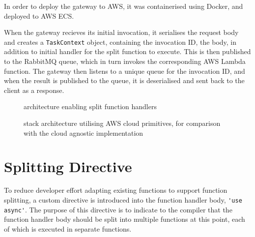 In order to deploy the gateway to AWS, it was containerised using Docker, and deployed to AWS ECS.

When the gateway recieves its initial invocation, it serialises the request body and creates a \verb|TaskContext| object, containing the invocation ID, the body, in addition to initial handler for the split function to execute. This is then published to the RabbitMQ queue, which in turn invokes the corresponding AWS Lambda function. The gateway then listens to a unique queue for the invocation ID, and when the result is published to the queue, it is deserialised and sent back to the client as a response.

\begin{figure}[htp]
    \centering
    \quad
    \caption{\faas{} architecture enabling split function handlers}
\end{figure}

\begin{figure*}
    \centering
    \caption{\faaas{} stack architecture utilising AWS cloud primitives, for comparison with the cloud agnostic \faaastime{} implementation}
    \label{fig:faaas-arch}
\end{figure*}

\section{Splitting Directive}
To reduce developer effort adapting existing functions to support function splitting, a custom directive is introduced into the function handler body, \verb|'use async'|. The purpose of this directive is to indicate to the \faaasc{} compiler that the function handler body should be split into multiple functions at this point, each of which is executed in separate \awslambda{} functions.


